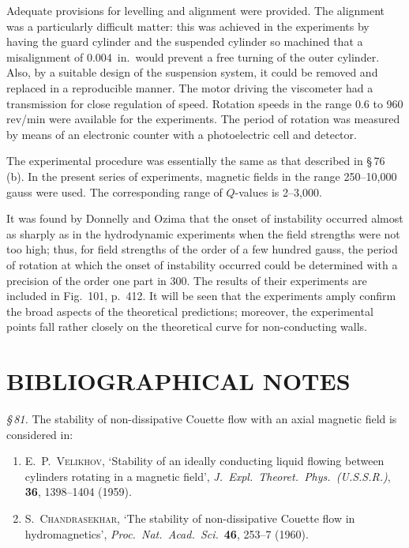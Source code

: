 Adequate provisions for levelling and alignment were provided. The alignment was a particularly difficult matter: this was achieved in the experiments by having the guard cylinder and the suspended cylinder so machined that a misalignment of 0.004~in.\ would prevent a free turning of the outer cylinder. Also, by a suitable design of the suspension system, it could be removed and replaced in a reproducible manner. The motor driving the viscometer had a transmission for close regulation of speed. Rotation speeds in the range 0.6 to 960 rev/min were available for the experiments. The period of rotation was measured by means of an electronic counter with a photoelectric cell and detector.

The experimental procedure was essentially the same as that described in \S\,76\,(b). In the present series of experiments, magnetic fields in the range 250--10,000 gauss were used. The corresponding range of $Q$-values is 2--3,000.

It was found by Donnelly and Ozima that the onset of instability occurred almost as sharply as in the hydrodynamic experiments when the field strengths were not too high; thus, for field strengths of the order of a few hundred gauss, the period of rotation at which the onset of instability occurred could be determined with a precision of the order one part in 300. The results of their experiments are included in Fig.~101, p.~412. It will be seen that the experiments amply confirm the broad aspects of the theoretical predictions; moreover, the experimental points fall rather closely on the theoretical curve for non-conducting walls.

\section*{BIBLIOGRAPHICAL NOTES}

\noindent\textit{\S\,81.} The stability of non-dissipative Couette flow with an axial magnetic field is considered in:

\begin{enumerate}
\item E.~P.~\textsc{Velikhov}, `Stability of an ideally conducting liquid flowing between cylinders rotating in a magnetic field', \textit{J.\ Expl.\ Theoret.\ Phys.\ (U.S.S.R.)}, \textbf{36}, 1398--1404 (1959).

\item S.~\textsc{Chandrasekhar}, `The stability of non-dissipative Couette flow in hydromagnetics', \textit{Proc.\ Nat.\ Acad.\ Sci.}\ \textbf{46}, 253--7 (1960).
\end{enumerate}

